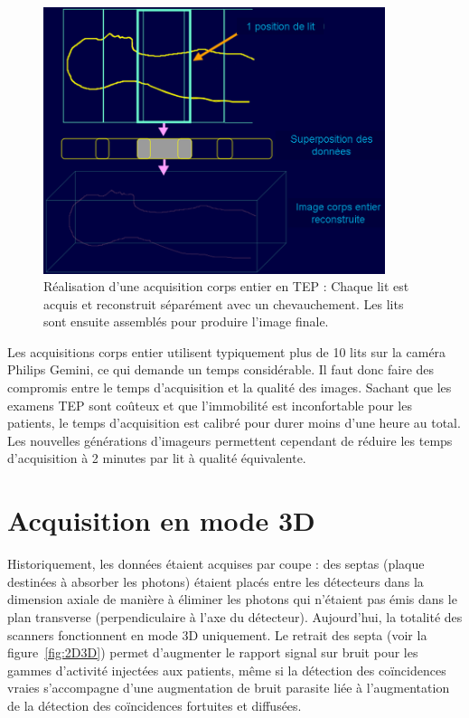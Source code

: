 \begin{figure}
\centering
\includegraphics[width=10cm]{images/multilits}
\caption[Acquisitions corps entier en TEP]{Réalisation d'une acquisition corps entier en TEP : Chaque lit est acquis et reconstruit séparément avec un chevauchement. Les lits sont ensuite assemblés pour produire l'image finale.}
\label{fig:multilits}
\end{figure}

Les acquisitions corps entier utilisent typiquement plus de 10 lits sur la caméra Philips Gemini, ce qui demande un temps considérable. Il faut donc faire des compromis entre le temps d'acquisition et la qualité des images. Sachant que les examens TEP sont coûteux et que l'immobilité est inconfortable pour les patients, le temps d'acquisition est calibré pour durer moins d'une heure au total. Les nouvelles générations d'imageurs permettent cependant de réduire les temps d'acquisition à 2 minutes par lit à qualité équivalente.


	\section{Acquisition en mode 3D}

Historiquement, les données étaient acquises par coupe : des septas (plaque destinées à absorber les photons) étaient placés entre les détecteurs dans la dimension axiale de manière à éliminer les photons qui n'étaient pas émis dans le plan  transverse (perpendiculaire à l'axe du détecteur). Aujourd'hui, la totalité des scanners fonctionnent en mode 3D uniquement. Le retrait des septa (voir la figure~\ref{fig:2D3D}) permet d'augmenter le rapport signal sur bruit pour les gammes d'activité injectées aux patients, même si la détection des coïncidences vraies s'accompagne d'une augmentation de bruit parasite liée à l'augmentation de la détection des coïncidences fortuites et diffusées.

